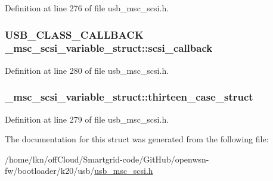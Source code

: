 Definition at line 276 of file usb\+\_\+msc\+\_\+scsi.\+h.

\subsubsection[{\texorpdfstring{scsi\+\_\+callback}{scsi_callback}}]{\setlength{\rightskip}{0pt plus 5cm}U\+S\+B\+\_\+\+C\+L\+A\+S\+S\+\_\+\+C\+A\+L\+L\+B\+A\+CK \+\_\+msc\+\_\+scsi\+\_\+variable\+\_\+struct\+::scsi\+\_\+callback}\hypertarget{struct__msc__scsi__variable__struct_a14d46998a82cc9c08b45ea6929d382e1}{}\label{struct__msc__scsi__variable__struct_a14d46998a82cc9c08b45ea6929d382e1}


Definition at line 280 of file usb\+\_\+msc\+\_\+scsi.\+h.

\subsubsection[{\texorpdfstring{thirteen\+\_\+case\+\_\+struct}{thirteen_case_struct}}]{ \+\_\+msc\+\_\+scsi\+\_\+variable\+\_\+struct\+::thirteen\+\_\+case\+\_\+struct}\hypertarget{struct__msc__scsi__variable__struct_ac93c46a41306d4e964303bdea2de1de0}{}\label{struct__msc__scsi__variable__struct_ac93c46a41306d4e964303bdea2de1de0}


Definition at line 279 of file usb\+\_\+msc\+\_\+scsi.\+h.



The documentation for this struct was generated from the following file\+:\begin{DoxyCompactItemize}
\item 
/home/lkn/off\+Cloud/\+Smartgrid-\/code/\+Git\+Hub/openwsn-\/fw/bootloader/k20/usb/\hyperlink{usb__msc__scsi_8h}{usb\+\_\+msc\+\_\+scsi.\+h}\end{DoxyCompactItemize}
